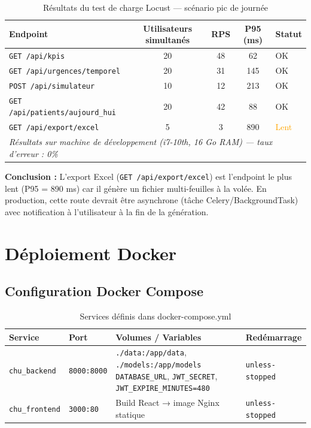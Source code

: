 \documentclass[12pt,a4paper]{report}
\begin{document}
	\begin{table}[H]
		\centering
		\caption{Résultats du test de charge Locust — scénario pic de journée}
		\renewcommand{\arraystretch}{1.2}
		\begin{tabular}{lcccl}
			\toprule
			\textbf{Endpoint} & \textbf{Utilisateurs simultanés} & \textbf{RPS} & \textbf{P95 (ms)} & \textbf{Statut} \\
			\midrule
			\texttt{GET /api/kpis}              & 20 & 48 &  62 & \textcolor{vertOK}{OK} \\
			\texttt{GET /api/urgences/temporel} & 20 & 31 & 145 & \textcolor{vertOK}{OK} \\
			\texttt{POST /api/simulateur}       & 10 & 12 & 213 & \textcolor{vertOK}{OK} \\
			\texttt{GET /api/patients/aujourd\_hui} & 20 & 42 & 88 & \textcolor{vertOK}{OK} \\
			\texttt{GET /api/export/excel}      & 5  &  3 & 890 & \textcolor{orange}{Lent} \\
			\midrule
			\multicolumn{5}{l}{\textit{Résultats sur machine de développement (i7-10th, 16 Go RAM) — taux d'erreur : 0\%}} \\
			\bottomrule
		\end{tabular}
	\end{table}
	
	\begin{infobox}
		\textbf{Conclusion :} L'export Excel (\texttt{GET /api/export/excel}) est l'endpoint
		le plus lent (P95 = 890 ms) car il génère un fichier multi-feuilles à la volée.
		En production, cette route devrait être asynchrone (tâche Celery/BackgroundTask) avec
		notification à l'utilisateur à la fin de la génération.
	\end{infobox}
	\newpage 
	\section{Déploiement Docker}
	
	\subsection{Configuration Docker Compose}
	
	\begin{table}[H]
		\centering
		\caption{Services définis dans docker-compose.yml}
		\renewcommand{\arraystretch}{1.3}
		\begin{tabularx}{\textwidth}{llXl}
			\toprule
			\textbf{Service} & \textbf{Port} & \textbf{Volumes / Variables} & \textbf{Redémarrage} \\
			\midrule
			\texttt{chu\_backend}  & \texttt{8000:8000} &
			\texttt{./data:/app/data}, \texttt{./models:/app/models} \newline
			\texttt{DATABASE\_URL}, \texttt{JWT\_SECRET}, \texttt{JWT\_EXPIRE\_MINUTES=480} &
			\texttt{unless-stopped} \\
			\texttt{chu\_frontend} & \texttt{3000:80} &
			Build React → image Nginx statique & \texttt{unless-stopped} \\
			\bottomrule
		\end{tabularx}
	\end{table}
	
\end{document}
